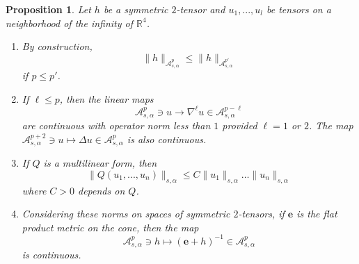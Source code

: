 \documentclass[12pt]{article}
\newtheorem{prop}[thm]{Proposition}
\newcommand{\calA}{{\mathcal A}}
\begin{document}
\begin{prop}\label{properties A epsilon k}
Let $h$ be a symmetric $2$-tensor and $u_1,...,u_l$ be tensors on a neighborhood of the infinity of $\mathbb{R}^4$. 
\begin{enumerate}
\item By construction, 
\[
\|h\|_{\calA^p_{s,\alpha}}\leqslant \|h\|_{\calA_{s,\alpha}^{p'}}
\]
if $p\leqslant p'$. 
\item If $\ell \leq p$, then the linear maps
\[
\calA^{p}_{s,\alpha} \ni u \longrightarrow \nabla^\ell u\in \calA^{p-\ell}_{s,\alpha}
\]
are continuous with operator norm less than $1$ provided $\ell =1$ or $2$. The map 
$\calA^{p+2}_{s,\alpha} \ni u \mapsto \Delta u \in \calA^{p}_{s,\alpha}$ is also continuous. 
\item If $Q$ is a multilinear form, then%
\[
\|Q(u_1,...,u_n)\|_{s,\alpha} \leqslant C\|u_1\|_{s,\alpha} \ldots \|u_n\|_{s,\alpha}
\]
where $C>0$ depends on $Q$.
\item Considering these norms on spaces of symmetric $2$-tensors, if $\mathbf{e}$ is the flat product
metric on the cone, then the map
\[
\calA_{s,\alpha}^p \ni h \mapsto (\mathbf{e}+h)^{-1}\in \calA^p_{s,\alpha} 
\]
is continuous. 
\end{enumerate}
\end{prop}
\end{document}
